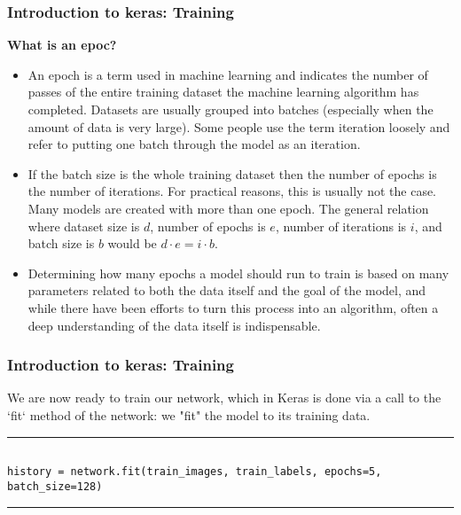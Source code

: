 \documentclass[11pt]{beamer}
\begin{document}
\begin{frame}[fragile]
\frametitle{Introduction to keras: Training}
\textbf{What is an epoc?}
\footnotesize
	\begin{itemize}
	\item 
An epoch is a term used in machine learning and indicates the number of passes of the entire training dataset the machine learning algorithm has completed. Datasets are usually grouped into batches (especially when the amount of data is very large). Some people use the term iteration loosely and refer to putting one batch through the model as an iteration.   
\item
If the batch size is the whole training dataset then the number of epochs is the number of iterations. For practical reasons, this is usually not the case. Many models are created with more than one epoch. The general relation where dataset size is $d$, number of epochs is $e$, number of iterations is $i$, and batch size is $b$ would be $d \cdot e = i \cdot b$. 
\item 
Determining how many epochs a model should run to train is based on many parameters related to both the data itself and the goal of the model, and while there have been efforts to turn this process into an algorithm, often a deep understanding of the data itself is indispensable.

	\end{itemize}
\end{frame}
\begin{frame}[fragile]
\frametitle{Introduction to keras: Training}
We are now ready to train our network, which in Keras is done via a call to the `fit` method of the network: we "fit" the model to its training data.
\vspace{0.5cm}
\scriptsize
\rule{\textwidth}{1pt}
\begin{verbatim}

history = network.fit(train_images, train_labels, epochs=5, batch_size=128)

\end{verbatim}
\rule{\textwidth}{1pt}
\end{frame}
\end{document}

